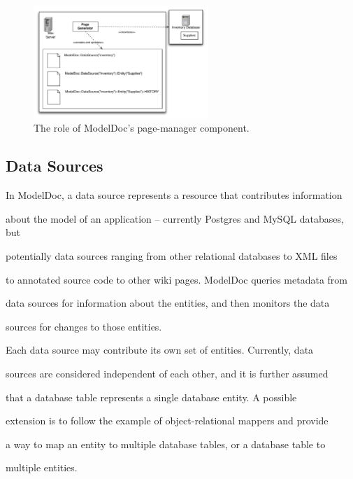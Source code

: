 \documentclass{acm_proc_article-sp}
\begin{document}
\begin{figure}

\centering


\includegraphics[width=250px]{PageManager.pdf}

\caption{The role of ModelDoc's page-manager component.}

\end{figure}



\subsection{Data Sources}



In ModelDoc, a data source represents a resource that contributes information

about the model of an application -- currently Postgres and MySQL databases, but

potentially data sources ranging from other relational databases to XML files

to annotated source code to other wiki pages.  ModelDoc queries metadata from

data sources for information about the entities, and then monitors the data

sources for changes to those entities.



Each data source may contribute its own set of entities.  Currently, data

sources are considered independent of each other, and it is further assumed

that a database table represents a single database entity.  A possible

extension is to follow the example of object-relational mappers and provide

a way to map an entity to multiple database tables, or a database table to

multiple entities.
\end{document}
